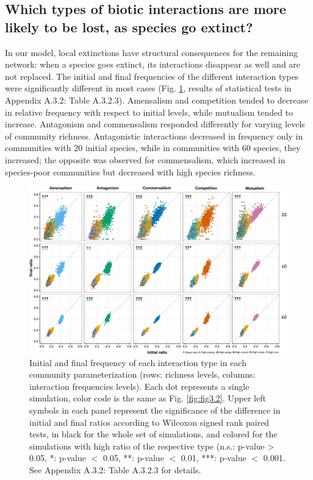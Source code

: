 \FloatBarrier

\subsection*{Which types of biotic interactions are more likely to be lost, as species go extinct?}

In our model, local extinctions have structural consequences for the remaining network: when a species goes extinct, its interactions disappear as well and are not replaced. The initial and final frequencies of the different interaction types were significantly different in most cases (Fig. \ref{fig:fig3.3}, results of statistical tests in Appendix A.3.2: Table A.3.2.3). Amensalism and competition tended to decrease in relative frequency with respect to initial levels, while mutualism tended to increase. Antagonism and commensalism responded differently for varying levels of community richness. Antagonistic interactions decreased in frequency only in communities with 20 initial species, while in communities with 60 species, they increased; the opposite was observed for commensalism, which increased in species-poor communities but decreased with high species richness.

\begin{figure}[!ht]
\centering
\includegraphics[width=\textwidth]{./Figures/chapter03/Fig_3.png}
\caption[Initial and final interaction ratios]{\color{Gray} Initial and final frequency of each interaction type in each community parameterization (rows: richness levels, columns: interaction frequencies levels). Each dot represents a single simulation, color code is the same as Fig. \ref{fig:fig3.2}. Upper left symbols in each panel represent the significance of the difference in initial and final ratios according to Wilcoxon signed rank paired tests, in black for the whole set of simulations, and colored for the simulations with high ratio of the respective type (n.s.: p-value > 0.05, *: p-value $<$ 0.05, **: p-value $<$ 0.01, ***: p-value $<$ 0.001. See Appendix A.3.2: Table A.3.2.3 for details.}
\label{fig:fig3.3}
\end{figure}

